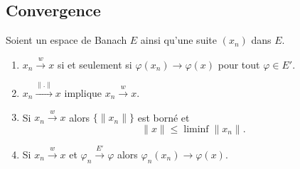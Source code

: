\subsection{Convergence}


\begin{proposition}     \label{PROPooFJBBooKkRwIp}
	Soient un espace de Banach \( E\) ainsi qu'une suite \( (x_n)\) dans \( E\).
	\begin{enumerate}
		\item       \label{ITEMooDMMTooSBINKN}
		      \( x_n\stackrel{w}{\longrightarrow}x\) si et seulement si \( \varphi(x_n)\to\varphi(x)\) pour tout \( \varphi\in E'\).
		\item       \label{ITEMooFZKXooNqFGUb}
		      \( x_n\stackrel{\| . \|}{\longrightarrow}x\) implique \( x_n\stackrel{w}{\longrightarrow}x\).
		\item       \label{ITEMooXPTSooYPwNgU}
		      Si \( x_n\stackrel{w}{\longrightarrow}x\) alors \( \{ \| x_n \| \}\) est borné et
		      \begin{equation}
			      \| x \|\leq \liminf\| x_n \|.
		      \end{equation}
		\item       \label{ITEMooAFRFooOXdsBy}
		      Si \( x_n\stackrel{w}{\longrightarrow}x\) et \( \varphi_n\stackrel{E'}{\longrightarrow}\varphi\) alors \( \varphi_n(x_n)\to\varphi(x)\).
	\end{enumerate}
\end{proposition}

